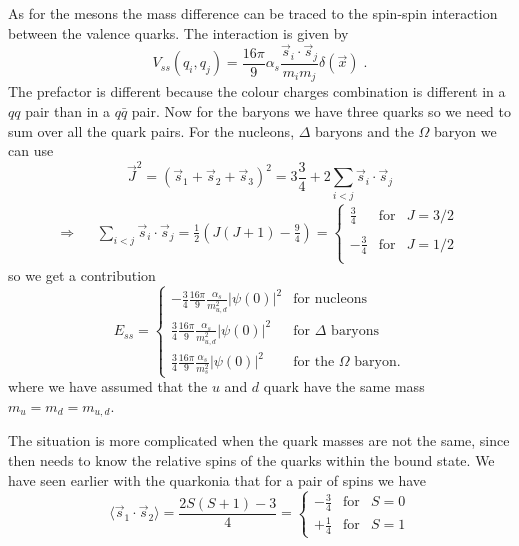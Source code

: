 \documentclass[12pt]{article}
\begin{document}
As for the mesons the mass difference can be traced to the spin-spin interaction between the valence quarks. The interaction is given by
\[V_{ss}(q_i,q_j)=\frac{16\pi}{9}\alpha_s\frac{\vec s_i\cdot \vec s_j}{m_i m_j}\delta(\vec x)\;.\]
The prefactor is different because the colour charges combination is different in a $qq$ pair than in a $q\bar q$ pair. Now for the baryons we have three quarks so we need to sum over all the quark pairs. For the nucleons, $\Delta$ baryons and the $\Omega$ baryon we can use
\[\vec J^2=(\vec s_1 +\vec s_2+\vec s_3)^2=3\frac{3}{4}+2\sum\limits_{i<j}\vec s_i\cdot \vec s_j\]
\begin{eqnarray*}
\Rightarrow&& \sum\limits_{i<j}\vec s_i\cdot\vec s_j=\frac{1}{2}\left(J(J+1)-\frac{9}{4}\right)
=\left\{\begin{array}{ccc}
\displaystyle\frac{3}{4}&\mbox{for}& J=3/2\\\\
\displaystyle-\frac{3}{4}&\mbox{for}& J=1/2\\
\end{array}\right.
\end{eqnarray*}
so we get a contribution 
\[E_{ss}=\left\{
\begin{array}{cc}
-\displaystyle\frac34\frac{16\pi}{9}\frac{\alpha_s}{m_{u,d}^2}|\psi(0)|^2&\mbox{for nucleons}\\
\displaystyle\frac34\frac{16\pi}{9}\frac{\alpha_s}{m_{u,d}^2}|\psi(0)|^2&\mbox{for $\Delta$ baryons}\\
\displaystyle\frac34\frac{16\pi}{9}\frac{\alpha_s}{m_s^2}|\psi(0)|^2&\mbox{for the $\Omega$ baryon.}
\end{array}
\right.\]
where we have assumed that the $u$ and $d$ quark have the same mass $m_u=m_d=m_{u,d}$.

The situation is more complicated when the quark masses are not the same, since then needs to know the relative spins of the quarks within the bound state. We have seen earlier with the quarkonia that for a pair of spins we have 
\[\langle \vec s_1 \cdot\vec s_2 \rangle=\frac{2S(S+1)-3}{4}=\left\{\begin{array}{ccc}-\frac{3}{4}&\mbox{for}& S=0 \\ +\frac{1}{4}&\mbox{for}& S=1 \end{array}\right.\] 
\end{document}

